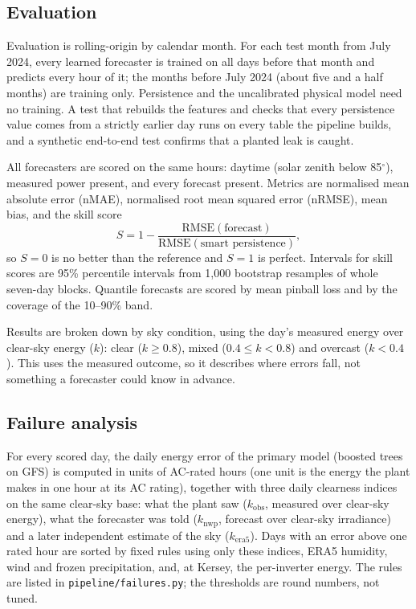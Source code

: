 \documentclass[11pt]{article}
\begin{document}
\subsection{Evaluation}

Evaluation is rolling-origin by calendar month. For each test month from July 2024, every learned forecaster is trained on all days before that month and predicts every hour of it; the months before July 2024 (about five and a half months) are training only. Persistence and the uncalibrated physical model need no training. A test that rebuilds the features and checks that every persistence value comes from a strictly earlier day runs on every table the pipeline builds, and a synthetic end-to-end test confirms that a planted leak is caught.

All forecasters are scored on the same hours: daytime (solar zenith below 85$^\circ$), measured power present, and every forecast present. Metrics are normalised mean absolute error (nMAE), normalised root mean squared error (nRMSE), mean bias, and the skill score
\[
S = 1 - \frac{\mathrm{RMSE}(\text{forecast})}{\mathrm{RMSE}(\text{smart persistence})},
\]
so $S=0$ is no better than the reference and $S=1$ is perfect. Intervals for skill scores are 95\% percentile intervals from 1,000 bootstrap resamples of whole seven-day blocks. Quantile forecasts are scored by mean pinball loss and by the coverage of the 10--90\% band.

Results are broken down by sky condition, using the day's measured energy over clear-sky energy ($k$): clear ($k \ge 0.8$), mixed ($0.4 \le k < 0.8$) and overcast ($k < 0.4$). This uses the measured outcome, so it describes where errors fall, not something a forecaster could know in advance.

\subsection{Failure analysis}

For every scored day, the daily energy error of the primary model (boosted trees on GFS) is computed in units of AC-rated hours (one unit is the energy the plant makes in one hour at its AC rating), together with three daily clearness indices on the same clear-sky base: what the plant saw ($k_\text{obs}$, measured over clear-sky energy), what the forecaster was told ($k_\text{nwp}$, forecast over clear-sky irradiance) and a later independent estimate of the sky ($k_\text{era5}$). Days with an error above one rated hour are sorted by fixed rules using only these indices, ERA5 humidity, wind and frozen precipitation, and, at Kersey, the per-inverter energy. The rules are listed in \texttt{pipeline/failures.py}; the thresholds are round numbers, not tuned.
\end{document}

